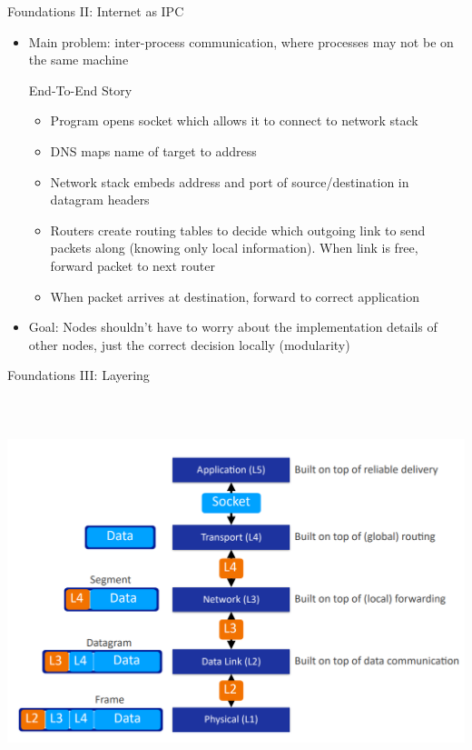 \documentclass{beamer}
\begin{document}
\begin{frame}[t]{Foundations II: Internet as IPC}
    \begin{itemize}
        \item Main problem: \alert{inter-process communication}, where processes may not be on the same machine
        \begin{exampleblock}{End-To-End Story}
            \begin{itemize}
                \item \pause Program opens \alert{socket} which allows it to connect to \alert{network stack}
                \item \pause \alert{DNS} maps name of target to \alert{address}
                \item \pause Network stack embeds address and \alert{port} of source/destination in datagram headers
                \item \pause \alert{Routers} create \alert{routing tables} to decide which \alert{outgoing link} to send packets along (knowing only local information). When link is free, forward packet to next router
                \item \pause When packet arrives at destination, forward to correct application
            \end{itemize}
        \end{exampleblock}
        \item Goal: Nodes shouldn't have to worry about the implementation details of other nodes, just the correct decision locally (modularity)
    \end{itemize}
\end{frame}

\begin{frame}{Foundations III: Layering}
    \includegraphics[height=12cm]{layer diagram.png}
\end{frame}
\end{document}

